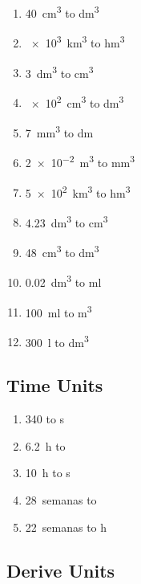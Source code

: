 \begin{exercise}
    \phantom{a}
    \begin{enumerate}[label=\letraminuscula]
        \item \qty{40}{\cubic\centi\m} to \unit{\cubic\deci\m}
        \item \qty{e3}{\cubic\kilo\m} to \unit{\cubic\hecto\m}
        \item \qty{3}{\cubic\deca\m} to \unit{\cubic\centi\m}
        \item \qty{e2}{\cubic\centi\m} to \unit{\cubic\deci\m}
        \item \qty{7}{\cubic\milli\m} to \unit{\deca\m}
        \item \qty{2e-2}{\cubic\m} to \unit{\cubic\milli\m}
        \item \qty{5e2}{\cubic\kilo\m} to \unit{\cubic\hecto\m}
        \item \qty{4.23}{\cubic\deca\m} to \unit{\cubic\centi\m}
        \item \qty{48}{\cubic\centi\m} to \unit{\cubic\deci\m}
        \item \qty{0.02}{\cubic\deca\m} to \unit{\milli\litre}
        \item \qty{100}{\milli\litre} to \unit{\cubic\metre}
        \item \qty{300}{\litre} to \unit{\cubic\deca\metre}
    \end{enumerate}
\end{exercise}

\subsection{Time Units}
\phantom{a}
\begin{exercise}
    \begin{enumerate}[label=\letraminuscula]
        \item \qty{340}{\min} to \unit{\s}
        \item \qty{6.2}{\hour} to \unit{\min}
        \item \qty{10}{\hour} to \unit{\s}
        \item \qty{28}{semanas} to \unit{\min}
        \item \qty{22}{semanas} to \unit{\hour}
    \end{enumerate}
\end{exercise}

\subsection{Derive Units}

